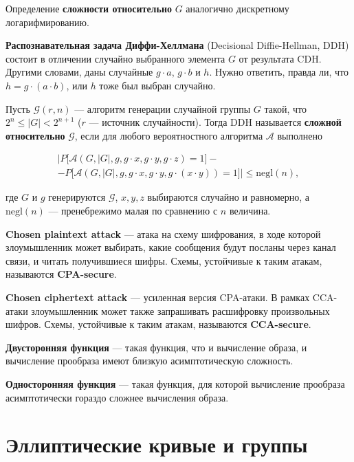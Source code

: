 \documentclass[a4paper,14pt]{extarticle}
\newcommand{\deff}{\vspace{0.2cm} \noindent}
\begin{document}
Определение \textbf{сложности относительно} $G$ аналогично дискретному
логарифмированию.

\deff \textbf{Распознавательная задача Диффи-Хеллмана} (Decisional
Diffie-Hellman, DDH) состоит в отличении случайно выбранного элемента
$G$ от результата CDH. Другими словами, даны случайные $g \cdot a$,
$g \cdot b$ и $h$. Нужно ответить, правда ли, что
$h = g \cdot (a \cdot b)$, или $h$ тоже был выбран случайно.

Пусть $\mathcal{G}(r, n)$ --- алгоритм генерации случайной группы $G$
такой, что $2^n \le |G| < 2^{n + 1}$ ($r$ --- источник случайности).
Тогда DDH называется \textbf{сложной относительно} $\mathcal{G}$, если
для любого вероятностного алгоритма $\mathcal{A}$ выполнено

\begin{multline*}
    \bigg| P \Big[
        \mathcal{A}(G, |G|, g, g \cdot x, g \cdot y, g \cdot z) = 1
    \Big] -\\- P \Big[ \mathcal{A}(
        G, |G|, g, g \cdot x, g \cdot y, g \cdot (x \cdot y)
    ) = 1 \Big] \bigg| \le \mathrm{negl}(n),
\end{multline*}

где $G$ и $g$ генерируются $\mathcal{G}$, $x, y, z$
выбираются случайно и равномерно, а $\mathrm{negl}(n)$ --- пренебрежимо
малая по сравнению с $n$ величина.

\deff \textbf{Chosen plaintext attack} --- атака на схему шифрования, в ходе
которой злоумышленник может выбирать, какие сообщения будут посланы
через канал связи, и читать получившиеся шифры. Схемы, устойчивые к
таким атакам, называются \textbf{CPA-secure}.

\deff \textbf{Chosen ciphertext attack} --- усиленная версия CPA-атаки. В
рамках CCA-атаки злоумышленник может также запрашивать расшифровку
произвольных шифров. Схемы, устойчивые к таким атакам, называются
\textbf{CCA-secure}.

\deff \textbf{Двусторонняя функция} --- такая функция, что и вычисление
образа, и вычисление прообраза имеют близкую асимптотическую сложность.

\deff \textbf{Односторонняя функция} --- такая функция, для которой
вычисление прообраза асимптотически гораздо сложнее вычисления образа.

\newpage

\section{Эллиптические кривые и группы}
\label{elliptic}
\end{document}
